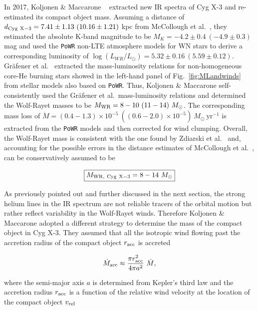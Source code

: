 \documentclass[a4paper,titlepage]{book}     	%
\newcommand{\sun}{\ensuremath{_\odot}}
\newcommand{\mdot}{\ensuremath{\dot{M}}}
\newcommand{\msun}{\ensuremath{M\sun}}
\newcommand{\lsun}{L_{\odot}}
\newcommand{\yr}{\text{yr}}
\newcommand{\mwr}{\ensuremath{M_\textup{WR}}}
\begin{document}
In 2017, Koljonen \& Maccarone \ \cite{CygX-3_Koljonen2017} extracted new IR spectra of Cyg X-3 and re-estimated its compact object mass. Assuming a distance of $d_{\rm Cyg~X-3} = 7.41 \pm 1.13~ (10.16 \pm 1.21)$ kpc from McCollough et al.\ \cite{CygX-3_McCollough2016_Observation}, they estimated the absolute K-band magnitude to be $M_K = -4.2 \pm 0.4~(-4.9 \pm 0.3)$ mag and used the \texttt{PoWR} non-LTE atmosphere models for WN stars \cite{WRnonLTEatmospheresPoWR_Todt2015} to derive a corresponding luminosity of $\log(L_{WR}/\lsun) = 5.32 \pm 0.16~(5.59 \pm 0.12)$. Gr{\"a}fener et al.\ \cite{Grafener2011_M-L_WR} extracted the mass-luminosity relations for non-homogeneous core-He burning stars showed in the left-hand panel of Fig.\ \ref{fig:MLandwinds} from stellar models also based on \texttt{PoWR}. Thus, Koljonen \& Maccarone self-consistently used the Gr{\"a}fener et al.\  mass-luminosity relations and determined the Wolf-Rayet masses to be $\mwr = 8-10~(11-14)~\msun$. The corresponding mass loss of $\mdot = (0.4-1.3) \times 10^{-5}~((0.6-2.0)\times 10^{-5})~\msun~\yr^{-1}$ is extracted from the \texttt{PoWR} models and then corrected for wind clumping. Overall, the Wolf-Rayet mass is consistent with the one found by Zdiarski et al.\ \cite{Cyg-X3_Zd2013} and, accounting for the possible errors in the distance estimates of McCollough et al.\ \cite{CygX-3_McCollough2016_Observation}, can be conservatively assumed to be

\begin{equation}\label{eq:MWRCygxX-3}
    \boxed{M_{\rm WR,~Cyg~X-3} = 8-14~\msun}
\end{equation}

As previously pointed out and further discussed in the next section, the strong helium lines in the IR spectrum are not reliable tracers of the orbital motion but rather reflect variability in the Wolf-Rayet winds. Therefore Koljonen \& Maccarone adopted a different strategy to determine the mass of the compact object in Cyg X-3. They assumed that all the isotropic wind flowing past the accretion radius of the compact object $r_{\rm acc}$ is accreted

\begin{equation}\label{eq:massaccretedBHCygX3}
    \mdot_{\rm acc} \approx \frac{\pi r_{\rm acc}^2}{4 \pi a^2} ~ \mdot{},
\end{equation}

where the semi-major axis $a$ is determined from Kepler's third law and the accretion radius $r_{\rm acc}$ is a function of the relative wind velocity at the location of the compact object $v_{\rm rel}$
\end{document}

